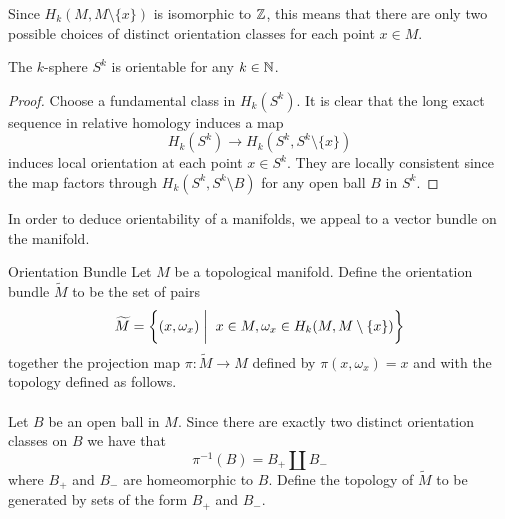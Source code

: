 \documentclass[a4paper]{article}
\begin{document}
Since $H_k(M,M\setminus\{x\})$ is isomorphic to $\mathbb{Z}$, this means that there are only two possible choices of distinct orientation classes for each point $x\in M$. 

\begin{lmm}{}{} The $k$-sphere $S^k$ is orientable for any $k\in\mathbb{N}$. \tcbline
\begin{proof}
Choose a fundamental class in $H_k(S^k)$. It is clear that the long exact sequence in relative homology induces a map $$H_k(S^k)\to H_k(S^k,S^k\setminus\{x\})$$ induces local orientation at each point $x\in S^k$. They are locally consistent since the map factors through $H_k(S^k,S^k\setminus B)$ for any open ball $B$ in $S^k$. 
\end{proof}
\end{lmm}

In order to deduce orientability of a manifolds, we appeal to a vector bundle on the manifold. 

\begin{defn}{Orientation Bundle}{} Let $M$ be a topological manifold. Define the orientation bundle $\widetilde{M}$ to be the set of pairs $$\widetilde{M}=\left\{(x,\omega_x)\;\bigg{|}\;\; x\in M, \omega_x\in H_k(M,M\setminus\{x\})\right\}$$ together the projection map $\pi:\widetilde{M}\to M$ defined by $\pi(x,\omega_x)=x$ and with the topology defined as follows. \\~\\

Let $B$ be an open ball in $M$. Since there are exactly two distinct orientation classes on $B$ we have that $$\pi^{-1}(B)=B_+\amalg B_-$$ where $B_+$ and $B_-$ are homeomorphic to $B$. Define the topology of $\widetilde{M}$ to be generated by sets of the form $B_+$ and $B_-$. 
\end{defn}
\end{document}

